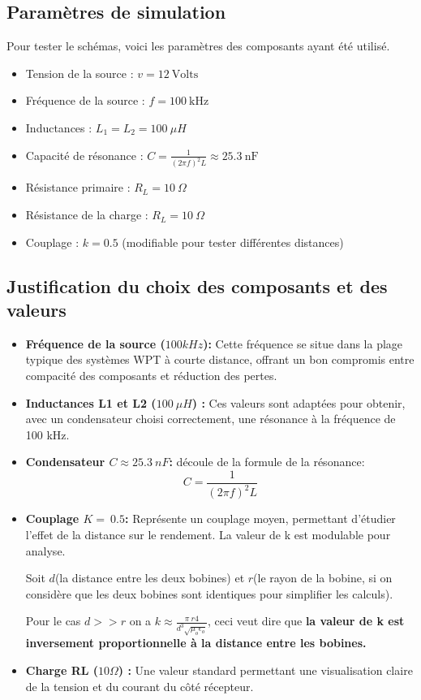 \documentclass[12pt,a4paper,titlepage,notitlepage]{article}
\begin{document}
	
	\subsection{Paramètres de simulation}
	Pour tester le schémas, voici les paramètres des composants ayant été utilisé.
	\begin{itemize}
		\item Tension de la source : $v = 12\ \text{Volts} $
		\item Fréquence de la source : $f = 100\ \text{kHz}$
		\item Inductances : $L_1 = L_2 = 100\ \mu H$
		\item Capacité de résonance : $C = \frac{1}{(2\pi f)^2 L} \approx 25.3\ \text{nF}$
		\item Résistance primaire : $R_L = 10\ \Omega$
		\item Résistance de la charge : $R_L = 10\ \Omega$
		\item Couplage : $k = 0.5$ (modifiable pour tester différentes distances)
	\end{itemize}
	
	\subsection{Justification du choix des composants et des valeurs}
	\begin{itemize}
		\item \textbf{Fréquence de la source ($100 kHz$):} Cette fréquence se situe dans la plage typique des systèmes WPT à courte distance, offrant un bon compromis entre compacité des composants et réduction des pertes.
		\item \textbf{Inductances L1 et L2 ($100\ \mu H$) :} Ces valeurs sont adaptées pour obtenir, avec un condensateur choisi correctement, une résonance à la fréquence de 100 kHz.
		\item  \textbf{Condensateur  $C \approx 25.3\ nF$:} découle de la formule de la résonance:  $$C = \frac{1}{(2\pi f)^2 L}$$
		\item \textbf{Couplage $K=\ 0.5$:} Représente un couplage moyen, permettant d'étudier l'effet de la distance sur le rendement. La valeur de k est modulable pour analyse.
		
		Soit $d$(la distance entre les deux bobines) et $r$(le rayon de la bobine, si on considère que les deux bobines sont identiques pour simplifier les calculs).
		
		Pour le cas $d >> r$ on a $k \approx \frac{\pi \ r4}{d^3 \sqrt{\mu_o \epsilon_o}}$, ceci veut dire que \textbf{la valeur de k est inversement proportionnelle à la distance entre les bobines.}
		\item \textbf{Charge RL ($10 \Omega$) :} Une valeur standard permettant une visualisation claire de la tension et du courant du côté récepteur.
	\end{itemize}
	
\end{document}
